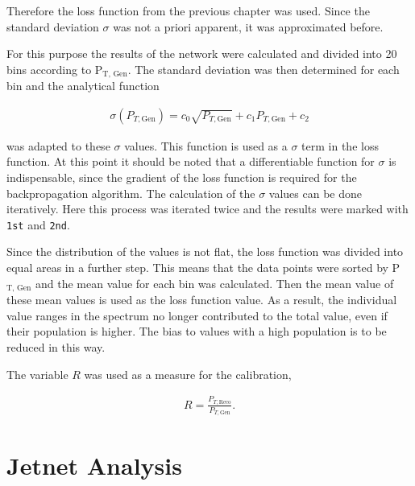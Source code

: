 \documentclass[12pt, a4paper]{thesis}
\begin{document}
Therefore the loss function from the previous chapter was used. Since
the standard deviation \(\sigma\) was not a priori apparent, it was
approximated before.

For this purpose the results of the network were calculated and
divided into 20 bins according to P\(_{\text{T, }\text{Gen}}\). The standard deviation
was then determined for each bin and the analytical function 

\begin{align}
\sigma(P_{T, \text{Gen}})= c_0 \sqrt{P_{T, \text{Gen}}}+c_1 P_{T, \text{Gen}} + c_2
\end{align}

was adapted to these \(\sigma\) values. This function is used as a
\(\sigma\) term in the loss function. At this point it should be noted
that a differentiable function for \(\sigma\) is indispensable, since
the gradient of the loss function is required for the backpropagation
algorithm. The calculation of the \(\sigma\) values can be done
iteratively. Here this process was iterated twice and the results were
marked with \texttt{1st} and \texttt{2nd}.


Since the distribution of the values is not flat, the loss function
was divided into equal areas in a further step. This means that the
data points were sorted by P\(_{\text{T, }\text{Gen}}\) and the mean value for
each bin was calculated. Then the mean value of these mean values is
used as the loss function value. As a result, the individual value
ranges in the spectrum no longer contributed to the total value, even
if their population is higher. The bias to values with a high
population is to be reduced in this way.

The variable \(R\) was used as a measure for the calibration,

\begin{align}
R = \frac{P_{T, \text{Reco}}}{P_{T, \text{Gen}}}.
\end{align}

\section{Jetnet Analysis}
\label{sec:org03235a3}
\end{document}
